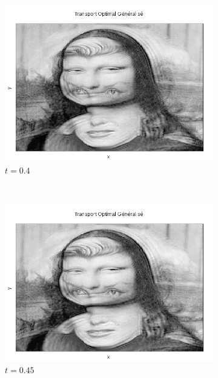 \documentclass[a4paper,12pt]{article}
\begin{document}
\begin{figure}[!h]
\begin{subfigure}[b]{0.23\linewidth}
\includegraphics[width=\linewidth]{img/2DMorphing/T_00089.png}
\caption*{$t=0.4$}
\end{subfigure}
~
\begin{subfigure}[b]{0.23\linewidth}
\includegraphics[width=\linewidth]{img/2DMorphing/T_00100.png}
\caption*{$t=0.45$}
\end{subfigure}
~
\begin{subfigure}[b]{0.23\linewidth}

\end{subfigure}
\end{figure}
\end{document}
